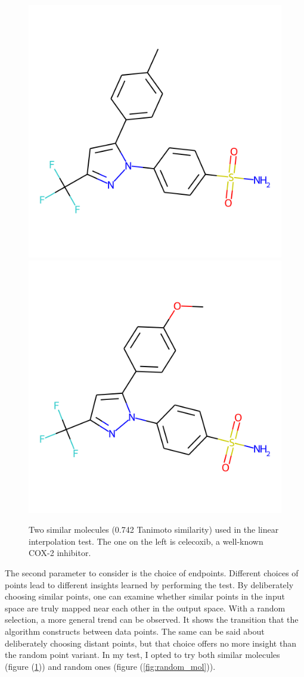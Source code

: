 \begin{figure}[!h]
	\centering
	\includegraphics[width=0.49\columnwidth]{figures/coxib1}
	\includegraphics[width=0.49\columnwidth]{figures/coxib2}
	\caption{Two similar molecules (0.742 Tanimoto similarity) used in the linear interpolation test. The one on the left is celecoxib, a well-known COX-2 inhibitor. }
	\label{fig:coxib}
\end{figure}

The second parameter to consider is the choice of endpoints. Different choices of points lead to different insights learned by performing the test. By deliberately choosing similar points, one can examine whether similar points in the input space are truly mapped near each other in the output space. With a random selection, a more general trend can be observed. It shows the transition that the algorithm constructs between data points. The same can be said about deliberately choosing distant points, but that choice offers no more insight than the random point variant. In my test, I opted to try both similar molecules (figure (\ref{fig:coxib})) and random ones (figure (\ref{fig:random_mol})).

